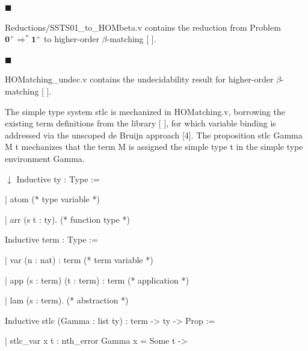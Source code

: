 \documentclass[10pt,a4paper]{amsart}
\begin{document}
 
 
\par\noindent  $\blacksquare$ 
 
Reductions/SSTS01\_to\_HOMbeta.v contains the reduction from Problem $\mathbf{0}^{+}\Rightarrow^{*}\mathbf{1}^{+}$ to higher-order $\beta$-matching [ ].\par
 
 
 
\par\noindent  $\blacksquare$ 
 
HOMatching\_undec.v contains the undecidability result for higher-order $\beta$-matching [ ].\par
 
 
  
 
 
The simple type system stlc is mechanized in HOMatching.v, borrowing the existing term definitions from the library [ ], for which variable binding is addressed via the unscoped de Bruijn approach [4]. The proposition stlc Gamma M t mechanizes that the term M is assigned the simple type t in the simple type environment Gamma.\par
  \ensuremath{\downarrow} 
 Inductive ty : Type := 
 
  | atom (* type variable *) 
 
  | arr (s t : ty). (* function type *) 
 
 
 
 Inductive term : Type := 
 
  | var (n : nat) : term (* term variable *) 
 
  | app (s : term) (t : term) : term (* application *) 
 
  | lam (s : term). (* abstraction *) 
 
 
 
 Inductive stlc (Gamma : list ty) : term -> ty -> Prop := 
 
  | stlc\_var x t : nth\_error Gamma x = Some t -> 
 
\end{document}
